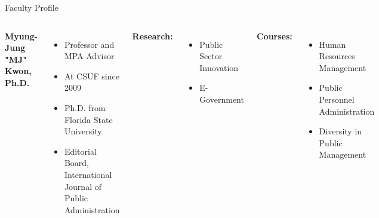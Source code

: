 \documentclass[10pt]{beamer}
\newlength{\imageheight}
\begin{document}
        \begin{frame}{Faculty Profile}
        \begin{columns}[T]
        \textbf{Myung-Jung "MJ" Kwon, Ph.D.}
        \begin{itemize}
        \item Professor and MPA Advisor
        \item At CSUF since 2009
        \item Ph.D. from Florida State University
        \item Editorial Board, International Journal of Public Administration
        \end{itemize}
        
        \textbf{Research:}
        \begin{itemize}
        \item Public Sector Innovation
        \item E-Government
        \end{itemize}
        
        \textbf{Courses:}
        \begin{itemize}
        \item Human Resources Management
        \item Public Personnel Administration
        \item Diversity in Public Management
        \end{itemize}

        \vspace*{0.5cm}
        \includegraphics[height=\imageheight]{images/kwon.jpg}
        \end{columns}
        \end{frame}
    
\end{document}
